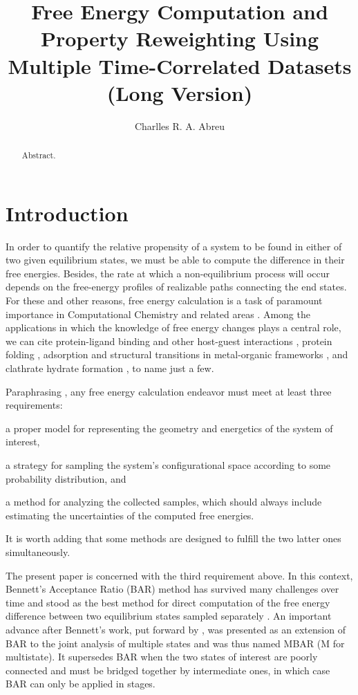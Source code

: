 \documentclass[journal=jctcce,manuscript=article,layout=twocolumn]{achemso}
\author{Charlles R. A. Abreu}
\affiliation{Chemical Engineering Department, Escola de Quimica, Universidade Federal do Rio de Janeiro, Rio de Janeiro, RJ 21941-909, Brazil}
\title{Free Energy Computation and Property Reweighting Using Multiple Time-Correlated Datasets \\ (Long Version)}
\begin{document}


\begin{abstract}
Abstract.
\end{abstract}

\section{Introduction}
\label{sec:introduction}

In order to quantify the relative propensity of a system to be found in either of two given equilibrium states, we must be able to compute the difference in their free energies. Besides, the rate at which a non-equilibrium process will occur depends on the free-energy profiles of realizable paths connecting the end states. For these and other reasons, free energy calculation is a task of paramount importance in Computational Chemistry and related areas \cite{Chipot_2007, Christ_2010, Hansen_2014}. Among the applications in which the knowledge of free energy changes plays a central role, we can cite protein-ligand binding \cite{Chodera_2011, Abel_2017, Abel_2017_2, Cournia_2017, Mobley_2017} and other host-guest interactions \cite{X}, protein folding \cite{Perez_2016, X}, adsorption and structural transitions in metal-organic frameworks \cite{Coudert_2008, Bousquet_2012, Ghysels_2013, Demuynck_2017}, and clathrate hydrate formation \cite{X}, to name just a few.

Paraphrasing \citeauthor{Christ_2010} \cite{Christ_2010}, any free energy calculation endeavor must meet at least three requirements: \begin{enumerate*}[label = \arabic*)] \item a proper model for representing the geometry and energetics of the system of interest, \item a strategy for sampling the system's configurational space according to some probability distribution, and \item a method for analyzing the collected samples, which should always include estimating the uncertainties of the computed free energies.\end{enumerate*} It is worth adding that some methods are designed to fulfill the two latter ones simultaneously.

The present paper is concerned with the third requirement above. In this context, Bennett's Acceptance Ratio (BAR) method \cite{Bennett_1976} has survived many challenges over time and stood as the best method for direct computation of the free energy difference between two equilibrium states sampled separately \cite{Lu_2003, Shirts_2005}. An important advance after Bennett's work, put forward by \citeauthor{Shirts_2008} \cite{Shirts_2008}, was presented as an extension of BAR to the joint analysis of multiple states and was thus named MBAR (M for multistate). It supersedes BAR when the two states of interest are poorly connected and must be bridged together by intermediate ones, in which case BAR can only be applied in stages.
\end{document}
